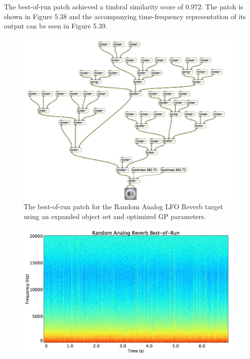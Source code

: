 \documentclass[a4paper,12pt]{report} 	%
\numberwithin{figure}{chapter}
\numberwithin{table}{chapter}
\numberwithin{equation}{chapter}
\begin{document}
\begin{flushleft}
The best-of-run patch achieved a timbral similarity score of $0.972$. The patch is shown in Figure 5.38 and the accompanying time-frequency representation of its output can be seen in Figure 5.39.

\begin{figure}[h!]
\begin{center}
\includegraphics[angle=270, scale=0.65]{RandomAnalog_Best}
\caption[Random Analog LFO Reverb Best-of-Run Patch]{The best-of-run patch for the Random Analog LFO Reverb target using an expanded object set and optimized GP parameters.}
\end{center}
\end{figure}
\begin{figure}[h!]
\begin{center}
\includegraphics[scale=0.35,width=\linewidth]{RandomAnalogReverbBestOfRunSTFT}

\end{center}
\end{figure}
\end{flushleft}
\end{document}

